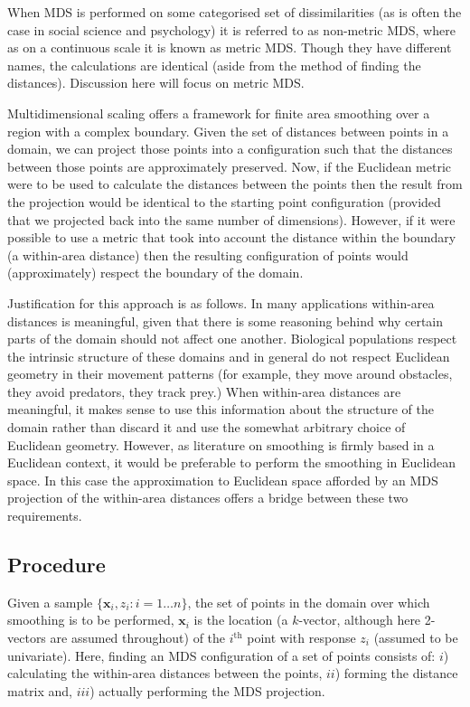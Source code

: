When MDS is performed on some categorised set of dissimilarities (as is often the case in social science and psychology) it is referred to as non-metric MDS, where as on a continuous scale it is known as metric MDS. Though they have different names, the calculations are identical (aside from the method of finding the distances). Discussion here will focus on metric MDS.

Multidimensional scaling offers a framework for finite area smoothing over a region with a complex boundary. Given the set of distances between points in a domain, we can project those points into a configuration such that the distances between those points are approximately preserved. Now, if the Euclidean metric were to be used to calculate the distances between the points then the result from the projection would be identical to the starting point configuration (provided that we projected back into the same number of dimensions). However, if it were possible to use a metric that took into account the distance within the boundary (a within-area distance) then the resulting configuration of points would (approximately) respect the boundary of the domain.

Justification for this approach is as follows. In many applications within-area distances is meaningful, given that there is some reasoning behind why certain parts of the domain should not affect one another. Biological populations respect the intrinsic structure of these domains and in general do not respect Euclidean geometry in their movement patterns (for example, they move around obstacles, they avoid predators, they track prey.) When within-area distances are meaningful, it makes sense to use this information about the structure of the domain rather than discard it and use the somewhat arbitrary choice of Euclidean geometry. However, as literature on smoothing is firmly based in a Euclidean context, it would be preferable to perform the smoothing in Euclidean space. In this case the approximation to Euclidean space afforded by an MDS projection of the within-area distances offers a bridge between these two requirements.

\subsection{Procedure}
\label{mdsproc}
Given a sample $\{\mathbf{x}_i, z_i : i=1\dots n\}$, the set of points in the domain over which smoothing is to be performed, $\mathbf{x}_i$ is the location (a $k$-vector, although here 2-vectors are assumed throughout) of the $i^\text{th}$ point with response $z_i$ (assumed to be univariate). Here, finding an MDS configuration of a set of points consists of: $i$) calculating the within-area distances between the points, $ii$) forming the distance matrix and, $iii$) actually performing the MDS projection.

